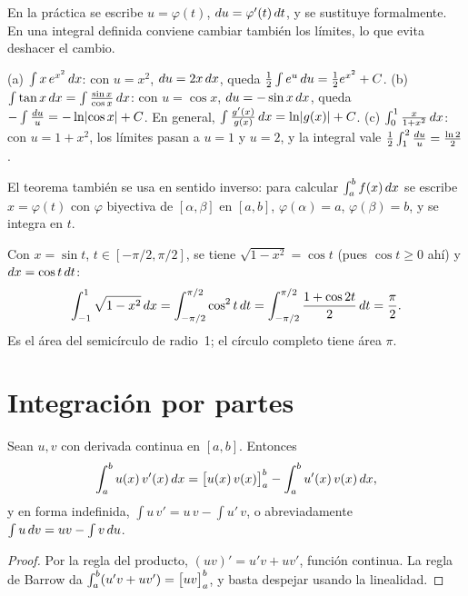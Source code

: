En la práctica se escribe $u=\varphi(t)$, $\mathop{}\!d u=\varphi'(t)\mathop{}\!d t$, y se sustituye formalmente. En una integral definida conviene cambiar también los límites, lo que evita deshacer el cambio.

\begin{ejemplo}\label{ej:sustitucion}
(a) $\int x\,e^{x^{2}}\mathop{}\!d x$: con $u=x^{2}$, $\mathop{}\!d u=2x\mathop{}\!d x$, queda $\frac12\int e^{u}\mathop{}\!d u=\frac12e^{x^{2}}+C$.
(b) $\int\tan x\mathop{}\!d x=\int\frac{\sin x}{\cos x}\mathop{}\!d x$: con $u=\cos x$, $\mathop{}\!d u=-\sin x\mathop{}\!d x$, queda $-\int\frac{\mathop{}\!d u}{u}=-\ln\lvert\cos x\rvert+C$. En general, $\int\frac{g'(x)}{g(x)}\mathop{}\!d x=\ln\lvert g(x)\rvert+C$.
(c) $\int_0^1\frac{x}{1+x^{2}}\mathop{}\!d x$: con $u=1+x^{2}$, los límites pasan a $u=1$ y $u=2$, y la integral vale $\frac12\int_1^2\frac{\mathop{}\!d u}{u}=\frac{\ln2}{2}$.
\end{ejemplo}

El teorema también se usa en sentido inverso: para calcular $\int_a^b f(x)\mathop{}\!d x$ se escribe $x=\varphi(t)$ con $\varphi$ biyectiva de $[\alpha,\beta]$ en $[a,b]$, $\varphi(\alpha)=a$, $\varphi(\beta)=b$, y se integra en $t$.

\begin{ejemplo}\label{ej:circulo}
Con $x=\sin t$, $t\in[-\pi/2,\pi/2]$, se tiene $\sqrt{1-x^{2}}=\cos t$ (pues $\cos t\ge0$ ahí) y $\mathop{}\!d x=\cos t\mathop{}\!d t$:
\[
\int_{-1}^{1}\sqrt{1-x^{2}}\mathop{}\!d x=\int_{-\pi/2}^{\pi/2}\cos^{2}t\mathop{}\!d t=\int_{-\pi/2}^{\pi/2}\frac{1+\cos2t}{2}\mathop{}\!d t=\frac\pi2 .
\]
Es el área del semicírculo de radio~1; el círculo completo tiene área $\pi$.
\end{ejemplo}

\section{Integración por partes}

\begin{teorema}\label{teo:partes}
Sean $u,v$ con derivada continua en $[a,b]$. Entonces
\[
\int_a^b u(x)\,v'(x)\mathop{}\!d x=\bigl[u(x)\,v(x)\bigr]_{a}^{b}-\int_a^b u'(x)\,v(x)\mathop{}\!d x ,
\]
y en forma indefinida, $\int u\,v'=u\,v-\int u'\,v$, o abreviadamente $\int u\mathop{}\!d v=uv-\int v\mathop{}\!d u$.
\end{teorema}

\begin{proof}
Por la regla del producto, $(uv)'=u'v+uv'$, función continua. La regla de Barrow da $\int_a^b(u'v+uv')=\bigl[uv\bigr]_{a}^{b}$, y basta despejar usando la linealidad.
\end{proof}

